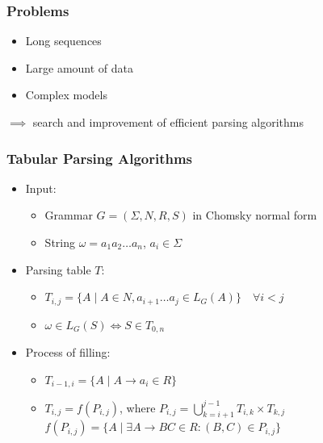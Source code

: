 \documentclass[xcolor=table]{beamer}
\begin{document}
\begin{frame}[fragile] \frametitle{Problems}

    \begin{itemize}
        \item Long sequences
        \item Large amount of data
        \item Complex models
        \hspace{20}
    \end{itemize} 
    $\implies$ search and improvement of efficient parsing algorithms

\end{frame}



\begin{frame}[fragile] \frametitle{Tabular Parsing Algorithms}

\begin{itemize}
    \item Input:
    \begin{itemize}
        \item Grammar $G = (\Sigma, N, R, S)$ in Chomsky normal form
        \item String $\omega = a_{1}a_{2} \dots a_{n}$, $a_i \in \Sigma$
    \end{itemize}
    \item Parsing table $T$:
        \begin{itemize}
            \item $T_{i, j} =  \{ A \mid A \in N, a_{i + 1} \dots a_{j} \in L_{G}(A)\} \quad \forall i < j$
            \item $\omega \in L_{G}(S) \iff S \in T_{0, n}$
        \end{itemize}
    \item Process of filling:
        \begin{itemize}
            \item $T_{i - 1, i} = \{ A \mid A \rightarrow a_{i} \in R\}$
            \vspace{5}
            \item $T_{i, j} = f(P_{i, j})$, where $P_{i, j} = \bigcup\limits_{k = i + 1}^{j - 1} T_{i,k} \times T_{k, j}$ \\ 
            \hspace{85} $f(P_{i, j}) = \{A \mid \exists A \rightarrow BC \in R : (B, C) \in P_{i, j}\}$
        \end{itemize}
    \end{itemize}
\end{frame}
\end{document}
